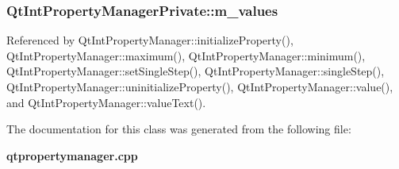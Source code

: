 \subsubsection[{m\+\_\+values}]{ Qt\+Int\+Property\+Manager\+Private\+::m\+\_\+values}\label{classQtIntPropertyManagerPrivate_a688b1d49a75753be051a530544285af1}


Referenced by Qt\+Int\+Property\+Manager\+::initialize\+Property(), Qt\+Int\+Property\+Manager\+::maximum(), Qt\+Int\+Property\+Manager\+::minimum(), Qt\+Int\+Property\+Manager\+::set\+Single\+Step(), Qt\+Int\+Property\+Manager\+::single\+Step(), Qt\+Int\+Property\+Manager\+::uninitialize\+Property(), Qt\+Int\+Property\+Manager\+::value(), and Qt\+Int\+Property\+Manager\+::value\+Text().



The documentation for this class was generated from the following file\+:\begin{DoxyCompactItemize}
\item 
{\bf qtpropertymanager.\+cpp}\end{DoxyCompactItemize}
